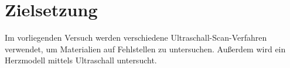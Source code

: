 \section{Zielsetzung}
\label{sec:Zielsetzung}
Im vorliegenden Versuch werden verschiedene Ultraschall-Scan-Verfahren verwendet, um Materialien auf Fehlstellen zu untersuchen. Außerdem wird ein Herzmodell mittels Ultraschall untersucht.
